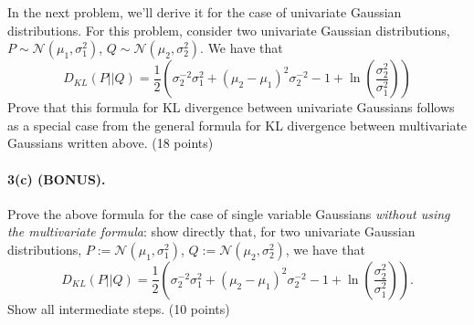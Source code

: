 \documentclass{article}
\begin{document}
 
 
In the next problem, we'll derive it for the case of univariate Gaussian distributions. For this problem, consider two univariate Gaussian distributions, $P \sim \mathcal{N}(\mu_1, \sigma_1^2)$, $Q \sim \mathcal{N}(\mu_2, \sigma_2^2)$. We have that
\[ D_{KL}(P||Q) = \frac12\left(\sigma_2^{-2} \sigma_1^2+(\mu_2-\mu_1)^2\sigma_2^{-2}-1+\ln\left(\frac{ \sigma_2^2}{\sigma_1^2}\right)\right)\]
Prove that this formula for KL divergence between univariate Gaussians follows as a special case from the general formula for KL divergence between multivariate Gaussians written above. (18 points) \\
 

 
\paragraph{3(c) (BONUS).} Prove the above formula for the case of single variable Gaussians \textit{without using the multivariate formula}: show directly that, for two univariate Gaussian distributions, $P := \mathcal{N}(\mu_1, \sigma_1^2)$, $Q := \mathcal{N}(\mu_2, \sigma_2^2)$, we have that
\[ D_{KL}(P||Q) = \frac12\left(\sigma_2^{-2} \sigma_1^2+(\mu_2-\mu_1)^2\sigma_2^{-2}-1+\ln\left(\frac{ \sigma_2^2}{\sigma_1^2}\right)\right).\]
Show all intermediate steps. (10 points)
\end{document}
